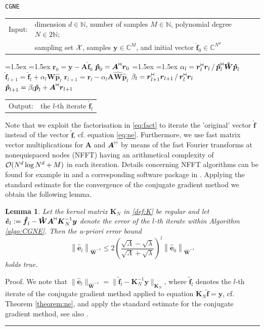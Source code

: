 \documentclass[11pt,a4paper,bibtotoc]{scrartcl}
\def\N{\mathbb{N}}
\def\C{\mathbb{C}}
\newcommand{\zb}[1]{\ensuremath{\boldsymbol{#1}}}
\newcommand{\adj}{{\vdash \hspace*{-1.72mm} \dashv}}
\renewcommand{\Box}{\hspace*{0ex} \hfill \rule{1.5ex}{1.5ex} \\ \goodbreak}
\newtheorem{lemma}[theorem]{Lemma}
\newenvironment{Lemma}{\goodbreak \begin{lemma}\sl}{\end{lemma}}
\numberwithin{equation}{section}
\numberwithin{table}{section}
\numberwithin{figure}{section}
\begin{document}
\begin{algorithm}[h!]
  \caption{\tt CGNE}\label{algo:CGNE}
  \begin{tabular}{ll}
    Input: & dimension $d\in \N$, number of samples $M\in \N$, polynomial
    degree $N\in 2\N$;\\
    & sampling set $\cal X$, samples $\zb y \in \C^M$, and initial vector $\zb
    {\hat f}_0 \in \C^{N^d}$
  \end{tabular}
  \begin{algorithmic}[1]
    \topsep=1.5ex \itemsep=1.5ex
    \STATE $\zb {r}_0=\zb y - \zb A \zb {\hat f}_0$
    \STATE $\zb {\hat p}_0=\zb A^{\adj} \zb {r}_0$
    \topsep=1.5ex \itemsep=1.5ex
    \STATE $\alpha_l= \zb {r}_l^{\adj} \zb {r}_l \,/\,
    {\zb {\hat p}_l^{\adj} \zb {\hat W} \zb {\hat p}_l}$
    \STATE $\zb {\hat f}_{l+1}=\zb {\hat f}_{l}
    +\alpha_l \zb {\hat W} \zb {\hat p}_l$
    \STATE $\zb {r}_{l+1}=\zb {r}_{l}- \alpha_l \zb A \zb {\hat W} \zb {\hat
    p}_l$ 
    \STATE $\beta_l={\zb {r}_{l+1}^{\adj} \zb {r}_{l+1}}\,/\,
    {\zb {r}_l^{\adj} \zb {r}_l}$
    \STATE $\zb {\hat p}_{l+1}=\beta_l \zb {\hat p}_l + \zb A^{\adj} \zb
    {r}_{l+1}$ 
    \ENDFOR
  \end{algorithmic}
  \begin{tabular}{ll}
    Output: & the $l$-th iterate $\zb {\hat f}_{l}$
  \end{tabular}
\end{algorithm}

Note that we exploit the factorisation in \eqref{eq:fact} to iterate the
'original' vector $\zb {\hat f}$ instead of the vector $\zb {\tilde f}$,
cf. equation \eqref{eq:ne}.
Furthermore, we use fast matrix vector multiplications for $\zb A$ and $\zb
A^{\adj}$ by means of the fast Fourier transforms at nonequispaced nodes
(NFFT) having an arithmetical complexity of ${\cal O}(N^d\log N^d+M)$ in each
  iteration.
Details concerning NFFT algorithms can be found for example in \cite{st97,
  postta01} and a corresponding software package in \cite{kupo02C}.
Applying the standard estimate for the convergence of the conjugate gradient
method we obtain the following lemma.

\begin{Lemma}\label{lemma:cg_error}
Let the kernel matrix $\zb K_N$ in \eqref{def:K} be regular and let
 $\zb {\hat e}_l:=\zb {\hat f}_l-\zb {\hat W}\zb A^{\adj}\zb K_N^{-1} \zb y$
 denote the error of the $l$-th iterate within Algorithm \ref{algo:CGNE}.
Then the a-priori error bound
\begin{equation*}
  \left\|\zb {\hat e}_l\right\|_{\zb {\hat W}^{-1}} \le
  2 \left(\frac{\sqrt{\Lambda}-\sqrt{\lambda}}{\sqrt{\Lambda}+
  \sqrt{\lambda}}\right)^l 
  \left\|\zb {\hat e}_0\right\|_{\zb {\hat W}^{-1}}
\end{equation*}
holds true.
\end{Lemma}
Proof. We note that $\|\zb {\hat e}_l\|_{\zb {\hat W}^{-1}}=\|\zb {\tilde f}_l
- \zb K_N^{-1} \zb y\|_{\zb K_N}$, where $\zb {\tilde f}_l$ denotes the $l$-th
iterate of the conjugate gradient method applied to equation $\zb K_N \zb
{\tilde f} = \zb y$, cf. Theorem \ref{theorem:ne}, and apply the standard
estimate for the conjugate gradient method, see also \cite[pp. 288]{Bj96}. \Box
\end{document}
